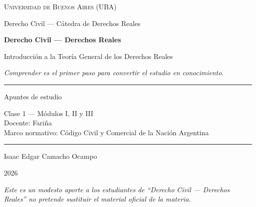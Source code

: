 \documentclass[12pt,oneside]{book}
\newcommand{\universidad}{Universidad de Buenos Aires (UBA)}
\newcommand{\carrera}{Derecho Civil --- C\'atedra de Derechos Reales}
\newcommand{\materia}{Derecho Civil --- Derechos Reales}
\newcommand{\titulo}{Introducci\'on a la Teor\'ia General de los Derechos Reales}
\newcommand{\autor}{Isaac Edgar Camacho Ocampo}
\newcommand{\anio}{2026}
\begin{document}
\begin{titlepage}

\thispagestyle{empty}

\begin{center}

\vspace*{1cm}

{\large \textsc{\universidad}}

\vspace{0.2cm}

{\large \carrera}

\vspace{3cm}

{\Huge \textbf{\materia}}

\vspace{1cm}

{\LARGE \titulo}

\vspace{0.8cm}

{\small \textit{Comprender es el primer paso para convertir el estudio en conocimiento.}}

\vspace{1.2cm}

\rule{0.70\textwidth}{0.5pt}

\vspace{0.5cm}

{\large Apuntes de estudio}

\vspace{0.3cm}

{\normalsize Clase 1 --- M\'odulos I, II y III \\[0.2em]
Docente: Fari\~na \\[0.2em]
Marco normativo: C\'odigo Civil y Comercial de la Naci\'on Argentina}

\vspace{0.5cm}

\rule{0.70\textwidth}{0.5pt}

\vfill

{\large \autor}

\vspace{0.3cm}

{\large \anio}

\end{center}

\vfill

\begin{flushleft}
\textit{Este es un modesto aporte a los estudiantes de ``Derecho Civil --- Derechos Reales'' no pretende sustituir el material oficial de la materia.}
\end{flushleft}

\end{titlepage}
\end{document}

